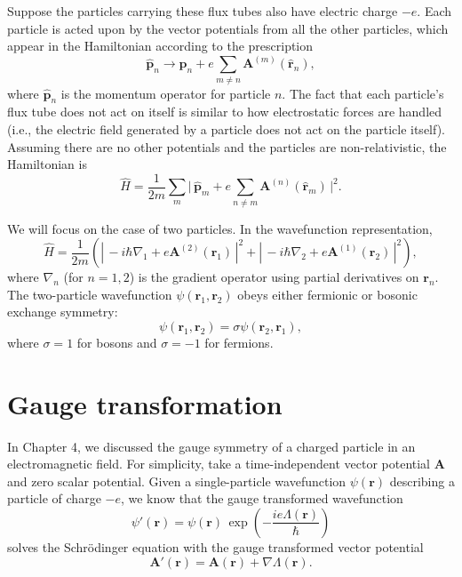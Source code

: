\documentclass[pra,12pt]{revtex4}
\begin{document}
Suppose the particles carrying these flux tubes also have electric
charge $-e$.  Each particle is acted upon by the vector potentials
from all the other particles, which appear in the Hamiltonian
according to the prescription
\begin{equation}
  \hat{\mathbf{p}}_n \rightarrow \hat{\mathbf{p}}_n
  + e \sum_{m \ne n} \mathbf{A}^{(m)}(\hat{\mathbf{r}}_n),
\end{equation}
where $\hat{\mathbf{p}}_n$ is the momentum operator for particle $n$.
The fact that each particle's flux tube does not act on itself is
similar to how electrostatic forces are handled (i.e., the electric
field generated by a particle does not act on the particle itself).
Assuming there are no other potentials and the particles are
non-relativistic, the Hamiltonian is
\begin{equation}
  \hat{H} = \frac{1}{2m} \sum_m \Big| \,\hat{\mathbf{p}}_m
  + e \sum_{n \ne m} \mathbf{A}^{(n)}(\hat{\mathbf{r}}_m)\,\Big|^2.
\end{equation}

We will focus on the case of two particles.  In the wavefunction
representation,
\begin{equation}
  \hat{H} = \frac{1}{2m} \left( \left| \, -i\hbar \nabla_1
  + e\mathbf{A}^{(2)}(\mathbf{r}_1)\,\right|^2
  + \left| \, -i\hbar \nabla_2
  + e\mathbf{A}^{(1)}(\mathbf{r}_2)\,\right|^2\right),
  \label{HamA}
\end{equation}
where $\nabla_n$ (for $n = 1,2$) is the gradient operator using
partial derivatives on $\mathbf{r}_n$.  The two-particle wavefunction
$\psi(\mathbf{r}_1, \mathbf{r}_2)$ obeys either fermionic or bosonic
exchange symmetry:
\begin{equation}
  \psi(\mathbf{r}_1, \mathbf{r}_2) = \sigma \psi(\mathbf{r}_2, \mathbf{r}_1),
  \label{exchange}
\end{equation}
where $\sigma = 1$ for bosons and $\sigma = -1$ for fermions.

\section{Gauge transformation}

In Chapter 4, we discussed the gauge symmetry of a charged particle in
an electromagnetic field.  For simplicity, take a time-independent
vector potential $\mathbf{A}$ and zero scalar potential.  Given a
single-particle wavefunction $\psi(\mathbf{r})$ describing a particle
of charge $-e$, we know that the gauge transformed wavefunction
\begin{equation}
  \psi'(\mathbf{r}) = \psi(\mathbf{r}) \,
  \exp\!\left(-\frac{ie\Lambda(\mathbf{r})}{\hbar}\right)
\end{equation}
solves the Schr\"odinger equation with the gauge transformed vector
potential
\begin{equation*}
  \mathbf{A}'(\mathbf{r}) = \mathbf{A}(\mathbf{r}) + \nabla \Lambda(\mathbf{r}).
\end{equation*}
\end{document}

